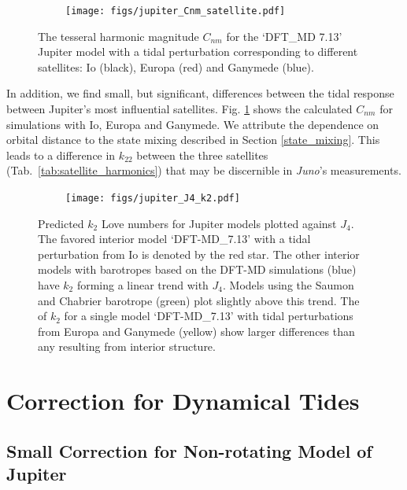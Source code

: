 \begin{figure}[h!]  
  \centering
    \texttt{[image: figs/jupiter\_Cnm\_satellite.pdf]}
\caption{ The tesseral harmonic magnitude $C_{nm}$ for the `DFT\_MD 7.13' Jupiter
model with a tidal perturbation corresponding to different satellites: Io (black),
Europa (red) and Ganymede (blue).}
\label{fig:tesseral_satellites}
\end{figure}

In addition, we find small, but significant, differences between the tidal response
between Jupiter's most influential satellites. Fig. \ref{fig:tesseral_satellites}
shows the calculated $C_{nm}$ for simulations with Io, Europa and Ganymede. We
attribute the dependence on orbital distance to the state mixing described in Section
\ref{state_mixing}. This leads to a difference in $k_{22}$ between the three
satellites (Tab.~\ref{tab:satellite_harmonics}) that may be discernible in
\textit{Juno}'s measurements.


\begin{figure}[h!]  
  \centering
    \texttt{[image: figs/jupiter\_J4\_k2.pdf]}
\caption{ Predicted $k_2$ Love numbers for Jupiter models plotted against $J_4$. The
    favored interior model `DFT-MD\_7.13' with a tidal perturbation from Io is
    denoted by the red star. The other interior models with barotropes based on the
    DFT-MD simulations (blue) have $k_2$ forming a linear trend with $J_4$.  Models
    using the Saumon and Chabrier barotrope (green) plot slightly above this trend.
    The of $k_2$ for a single model `DFT-MD\_7.13' with tidal perturbations from
    Europa and Ganymede (yellow) show larger differences than any resulting from
    interior structure.
    \label{fig:J4_k2}}
\end{figure}

\section{Correction for Dynamical Tides}

\subsection{Small Correction for Non-rotating Model of Jupiter}

